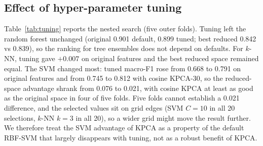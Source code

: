 \documentclass[conference]{IEEEtran}
\newcommand{\tabsize}{\footnotesize}
\begin{document}
\subsection{Effect of hyper-parameter tuning}
Table~\ref{tab:tuning} reports the nested search (five outer folds). Tuning left the random forest unchanged (original 0.901 default, 0.899 tuned; best reduced 0.842 vs 0.839), so the ranking for tree ensembles does not depend on defaults. For $k$-NN, tuning gave $+0.007$ on original features and the best reduced space remained equal. The SVM changed most: tuned macro-F1 rose from 0.668 to 0.791 on original features and from 0.745 to 0.812 with cosine KPCA-30, so the reduced-space advantage shrank from 0.076 to 0.021, with cosine KPCA at least as good as the original space in four of five folds. Five folds cannot establish a 0.021 difference, and the selected values sit on grid edges (SVM $C=10$ in all 20 selections, $k$-NN $k=3$ in all 20), so a wider grid might move the result further. We therefore treat the SVM advantage of KPCA as a property of the default RBF-SVM that largely disappears with tuning, not as a robust benefit of KPCA.

\begin{table}[t]
\caption{Nested hyper-parameter search: mean macro-F1 over five outer folds, default vs tuned settings, original features vs the best reduced space among PCA-30, KPCA-cos-30 and KPCA-RBF-30. $\Delta$: original minus reduced.}\label{tab:tuning}
\centering\tabsize
\resizebox{\columnwidth}{!}{}
\end{table}
\end{document}
